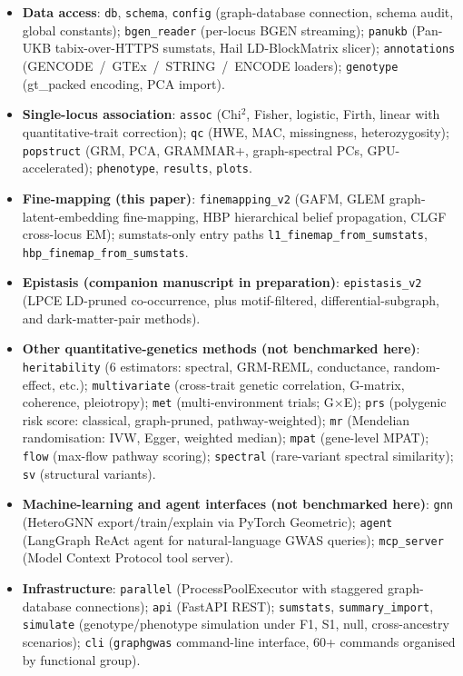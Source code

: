 \begin{itemize}
\item \textbf{Data access}: \texttt{db}, \texttt{schema}, \texttt{config}
      (graph-database connection, schema audit, global constants);
      \texttt{bgen\_reader} (per-locus BGEN streaming);
      \texttt{panukb} (Pan-UKB tabix-over-HTTPS sumstats,
      Hail LD-BlockMatrix slicer);
      \texttt{annotations} (GENCODE~/~GTEx~/~STRING~/~ENCODE
      loaders);
      \texttt{genotype} (gt\_packed encoding, PCA import).
\item \textbf{Single-locus association}: \texttt{assoc}
      (Chi$^2$, Fisher, logistic, Firth, linear with
      quantitative-trait correction); \texttt{qc} (HWE, MAC,
      missingness, heterozygosity); \texttt{popstruct} (GRM, PCA,
      GRAMMAR+, graph-spectral PCs, GPU-accelerated);
      \texttt{phenotype}, \texttt{results}, \texttt{plots}.
\item \textbf{Fine-mapping (this paper)}:
      \texttt{finemapping\_v2}
      (GAFM,
      GLEM graph-latent-embedding fine-mapping, HBP hierarchical belief propagation,
      CLGF cross-locus EM); sumstats-only entry paths
      \texttt{l1\_finemap\_from\_sumstats},
      \texttt{hbp\_finemap\_from\_sumstats}.
\item \textbf{Epistasis (companion manuscript in preparation)}:
      \texttt{epistasis\_v2}
      (LPCE LD-pruned co-occurrence, plus motif-filtered,
      differential-subgraph, and dark-matter-pair methods).
\item \textbf{Other quantitative-genetics methods (not benchmarked here)}:
      \texttt{heritability} (6 estimators: spectral, GRM-REML,
      conductance, random-effect, etc.);
      \texttt{multivariate} (cross-trait genetic correlation,
      G-matrix, coherence, pleiotropy);
      \texttt{met} (multi-environment trials; G$\times$E);
      \texttt{prs} (polygenic risk score: classical,
      graph-pruned, pathway-weighted);
      \texttt{mr} (Mendelian randomisation: IVW, Egger, weighted
      median);
      \texttt{mpat} (gene-level MPAT); \texttt{flow} (max-flow
      pathway scoring); \texttt{spectral} (rare-variant spectral
      similarity); \texttt{sv} (structural variants).
\item \textbf{Machine-learning and agent interfaces (not benchmarked here)}:
      \texttt{gnn} (HeteroGNN export/train/explain via PyTorch
      Geometric); \texttt{agent} (LangGraph ReAct agent for
      natural-language GWAS queries); \texttt{mcp\_server} (Model
      Context Protocol tool server).
\item \textbf{Infrastructure}: \texttt{parallel} (ProcessPoolExecutor
      with staggered graph-database connections); \texttt{api} (FastAPI
      REST); \texttt{sumstats}, \texttt{summary\_import},
      \texttt{simulate} (genotype/phenotype simulation under F1,
      S1, null, cross-ancestry scenarios);
      \texttt{cli} (\texttt{graphgwas} command-line interface,
      60+ commands organised by functional group).
\end{itemize}

